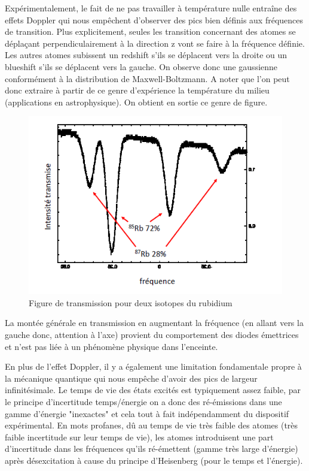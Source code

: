 Expérimentalement, le fait de ne pas travailler à température nulle entraîne des effets Doppler qui nous empêchent d'observer des pics bien définis aux fréquences de transition. Plus explicitement, seules les transition concernant des atomes se déplaçant perpendiculairement à la direction z vont se faire à la fréquence définie. Les autres atomes subissent un redshift s'ils se déplacent vers la droite ou un blueshift s'ils se déplacent vers la gauche. On observe donc une gaussienne conformément à la distribution de Maxwell-Boltzmann. A noter que l'on peut donc extraire à partir de ce genre d'expérience la température du milieu (applications en astrophysique). On obtient en sortie ce genre de figure.\\

\begin{figure}[htp]
    \centering
    \includegraphics[scale=1.0]{Images2/Absorption.PNG}
    \caption{Figure de transmission pour deux isotopes du rubidium}
    \label{fig:abso}
\end{figure}

La montée générale en transmission en augmentant la fréquence (en allant vers la gauche donc, attention à l'axe) provient du comportement des diodes émettrices et n'est pas liée à un phénomène physique dans l'enceinte.

En plus de l'effet Doppler, il y a également une limitation fondamentale propre à la mécanique quantique qui nous empêche d'avoir des pics de largeur infinitésimale. Le temps de vie des états excités est typiquement assez faible, par le principe d'incertitude temps/énergie on a donc des ré-émissions dans une gamme d'énergie "inexactes" et cela tout à fait indépendamment du dispositif expérimental. En mots profanes, dû au temps de vie très faible des atomes (très faible incertitude sur leur temps de vie), les atomes introduisent une part d'incertitude dans les fréquences qu'ils ré-émettent (gamme très large d'énergie) après désexcitation à cause du principe d'Heisenberg (pour le temps et l'énergie).\\

